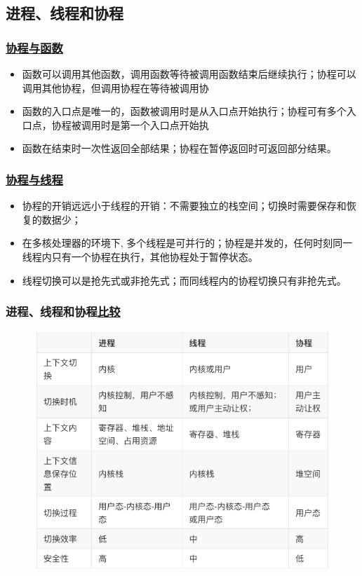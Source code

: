 \subsection{进程、线程和协程}
% 
\begin{frame}[fragile]
    \frametitle{\href{https://zh.wikipedia.org/wiki/\%E5\%8D\%8F\%E7\%A8\%8B}{协程与函数}}

    \begin{itemize}
        \item 函数可以调用其他函数，调用函数等待被调用函数结束后继续执行；协程可以调用其他协程，但调用协程在等待被调用协%
        \item 函数的入口点是唯一的，函数被调用时是从入口点开始执行；协程可有多个入口点，协程被调用时是第一个入口点开始执%
        \item 函数在结束时一次性返回全部结果；协程在暂停返回时可返回部分结果。
    \end{itemize}

% 

\end{frame}
\begin{frame}[fragile]
    \frametitle{\href{https://www.cnblogs.com/theRhyme/p/14061698.html}{协程与线程}}

    \begin{itemize}
        \item 协程的开销远远小于线程的开销：不需要独立的栈空间；切换时需要保存和恢复的数据少；
        \item 在多核处理器的环境下, 多个线程是可并行的；协程是并发的，任何时刻同一线程内只有一个协程在执行，其他协程处于暂停状态。
        \item 线程切换可以是抢先式或非抢先式；而同线程内的协程切换只有非抢先式。
    \end{itemize}

% 

\end{frame}
\begin{frame}[fragile]
    \frametitle{进程、线程和协程\href{https://www.cnblogs.com/theRhyme/p/14061698.html}{比较}}
% 
	\begin{figure}
		\centering
		\includegraphics[width=0.55\linewidth]{figs/proc-thread-coroutine.png}
	\end{figure}
\end{frame}


